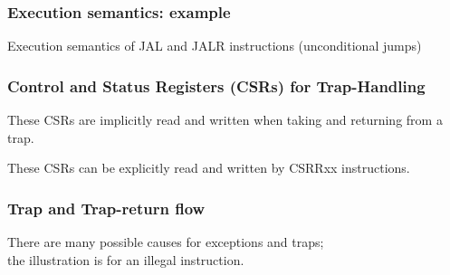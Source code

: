\begin{frame}
\frametitle{Execution semantics: example}

Execution semantics of JAL and JALR instructions (unconditional jumps)

\vspace{1ex}

\begin{center}
\end{center}

\end{frame}


\begin{frame}
\frametitle{Control and Status Registers (CSRs) for Trap-Handling}

\begin{center}
\end{center}

\vspace{1ex}

These CSRs are implicitly read and written when taking and returning from a trap.

These CSRs can be explicitly read and written by CSRRxx instructions.

\end{frame}


\begin{frame}
\frametitle{Trap and Trap-return flow}

\begin{center}
\end{center}

\vspace{1ex}

There are many possible causes for exceptions and traps; \\
the illustration is for an illegal instruction.

\end{frame}


